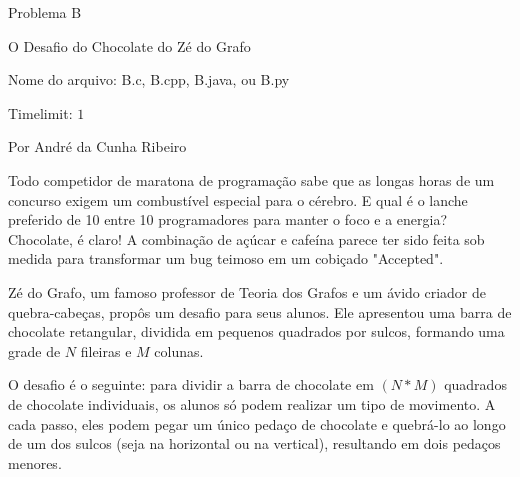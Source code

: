 \begin{center}
Problema B

O Desafio do Chocolate do Zé do Grafo

{\small Nome do arquivo: B.c, B.cpp, B.java, ou B.py}

{\large Timelimit: $1$}

{\tiny Por André da Cunha Ribeiro}

\end{center}					

Todo competidor de maratona de programação sabe que as longas horas de um concurso exigem um combustível especial para o cérebro. E qual é o lanche preferido de 10 entre 10 programadores para manter o foco e a energia? Chocolate, é claro! A combinação de açúcar e cafeína parece ter sido feita sob medida para transformar um bug teimoso em um cobiçado "Accepted".





Zé do Grafo, um famoso professor de Teoria dos Grafos e um ávido criador de quebra-cabeças, propôs um desafio para seus alunos. Ele apresentou uma barra de chocolate retangular, dividida em pequenos quadrados por sulcos, formando uma grade de $N$ fileiras e $M$ colunas.

O desafio é o seguinte: para dividir a barra de chocolate em $(N * M)$ quadrados de chocolate individuais, os alunos só podem realizar um tipo de movimento. A cada passo, eles podem pegar um único pedaço de chocolate e quebrá-lo ao longo de um dos sulcos (seja na horizontal ou na vertical), resultando em dois pedaços menores.

